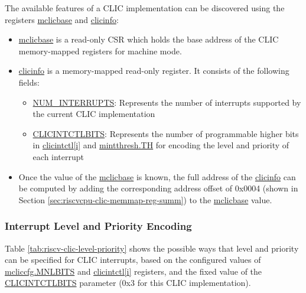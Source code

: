 \documentclass[main\_\_EN.tex]{subfiles}
\begin{document}
The available features of a CLIC implementation can be discovered using the registers \hyperref[regdesc:MCLICBASE_REG]{mclicbase}
and \hyperref[regdesc:CLICINFO_REG]{clicinfo}:
\begin{itemize}
    \item \hyperref[regdesc:MCLICBASE_REG]{mclicbase} is a read-only CSR which holds the base address of the CLIC memory-mapped registers for machine mode.
    \item \hyperref[regdesc:CLICINFO_REG]{clicinfo} is a memory-mapped read-only register. It consists of the following fields:
    \begin{itemize}
        \item \hyperref[fielddesc:CLICINFO_NUM_INTERRUPTS]{NUM\_INTERRUPTS}: Represents the number of interrupts supported by the current CLIC implementation
        \item \hyperref[fielddesc:CLICINFO_CLICINTCTLBITS]{CLICINTCTLBITS}: Represents the number of programmable higher bits in \hyperref[regdesc:MCLICINTCTL_REG_i]{clicintctl[i]} and \hyperref[fielddesc:MINTTHRESH_TH]{{mintthresh.TH}} for encoding the level and priority of each interrupt
    \end{itemize}
    \item Once the value of the \hyperref[fielddesc:MCLICBASE]{mclicbase} is known, the full address of the  \hyperref[regdesc:CLICINFO_REG]{clicinfo} can be computed by adding the corresponding address offset of 0x0004 (shown in Section \ref{sec:riscvcpu-clic-memmap-reg-summ}) to the \hyperref[fielddesc:MCLICBASE]{mclicbase} value.
\end{itemize}


\hypertarget{riscvcpu-clic-int-level-prio}{}
\subsubsection{Interrupt Level and Priority Encoding}
\label{sec:riscvcpu-clic-int-level-prio}

Table \ref{tab:riscv-clic-level-priority} shows the possible ways that level and priority can be specified for CLIC interrupts, based on the configured values of \hyperref[fielddesc:MCLICCFG_MNLBITS]{mcliccfg.MNLBITS} and \hyperref[regdesc:MCLICINTCTL_REG_i]{clicintctl[i]} registers, and the fixed value of the \hyperref[fielddesc:CLICINFO_CLICINTCTLBITS]{CLICINTCTLBITS} parameter (0x3 for this CLIC implementation).
\end{document}
